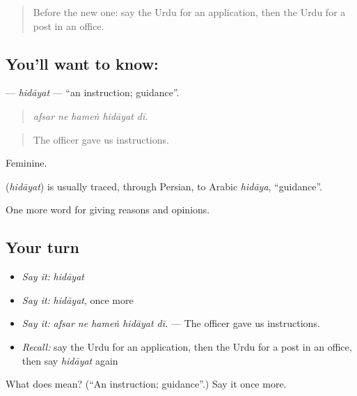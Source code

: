 \begin{quote}
Before the new one: say the Urdu for an application, then the Urdu for a post in an office.
\end{quote}

\subsection*{You'll want to know: }
\textbf{} — \emph{hidāyat} — \textquotedblleft{}an instruction; guidance\textquotedblright{}.

\begin{quote}
    
\end{quote}

\begin{quote}
\emph{afsar ne hameṅ hidāyat dī.}
\end{quote}

\begin{quote}
The officer gave us instructions.
\end{quote}

Feminine.

\begin{cousinweb}
\textbf{} (\emph{hidāyat}) is usually traced, through Persian, to Arabic \emph{hidāya}, \textquotedblleft{}guidance\textquotedblright{}.
\end{cousinweb}

\begin{grammarlens}[title={What you've built}]
One more word for giving reasons and opinions.
\end{grammarlens}

\subsection*{Your turn}
\begin{itemize}
\raggedright
  \item \emph{Say it:} \emph{hidāyat}
  \item \emph{Say it:} \emph{hidāyat}, once more
  \item \emph{Say it:} \emph{afsar ne hameṅ hidāyat dī.} — The officer gave us instructions.
  \item \emph{Recall:} say the Urdu for an application, then the Urdu for a post in an office, then say \emph{hidāyat} again
\end{itemize}

\begin{tcolorbox}[breakable,colback=teal!4,colframe=teal!35!black,title={Before you move on}]
What does  mean? (\textquotedblleft{}An instruction; guidance\textquotedblright{}.) Say it once more.
\end{tcolorbox}
